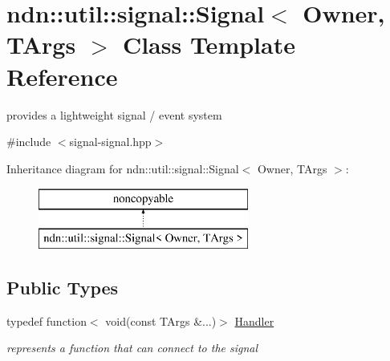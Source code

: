 \hypertarget{classndn_1_1util_1_1signal_1_1Signal}{}\section{ndn\+:\+:util\+:\+:signal\+:\+:Signal$<$ Owner, T\+Args $>$ Class Template Reference}
\label{classndn_1_1util_1_1signal_1_1Signal}


provides a lightweight signal / event system  




{\ttfamily \#include $<$signal-\/signal.\+hpp$>$}

Inheritance diagram for ndn\+:\+:util\+:\+:signal\+:\+:Signal$<$ Owner, T\+Args $>$\+:\begin{figure}[H]
\begin{center}
\leavevmode
\includegraphics[height=2.000000cm]{classndn_1_1util_1_1signal_1_1Signal}
\end{center}
\end{figure}
\subsection*{Public Types}
\begin{DoxyCompactItemize}
\item 
typedef function$<$ void(const T\+Args \&...)$>$ \hyperlink{classndn_1_1util_1_1signal_1_1Signal_a34d7bb02178bfbf9e624658d1920981c}{Handler}\hypertarget{classndn_1_1util_1_1signal_1_1Signal_a34d7bb02178bfbf9e624658d1920981c}{}\label{classndn_1_1util_1_1signal_1_1Signal_a34d7bb02178bfbf9e624658d1920981c}

\begin{DoxyCompactList}\small\item\em represents a function that can connect to the signal \end{DoxyCompactList}\end{DoxyCompactItemize}
